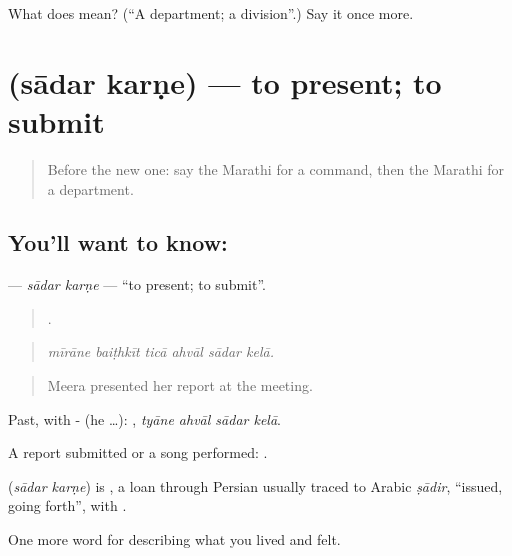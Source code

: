 \begin{tcolorbox}[breakable,colback=teal!4,colframe=teal!35!black,title={Before you move on}]
What does  mean? (\textquotedblleft{}A department; a division\textquotedblright{}.) Say it once more.
\end{tcolorbox}
\section[\texorpdfstring{\mr{सादर} \mr{करणे} (sādar karṇe)}{सादर करणे (sādar karṇe)}]{  (sādar karṇe) — to present; to submit}

\label{lesson:MR-C513-sadar-karne}



\begin{quote}
Before the new one: say the Marathi for a command, then the Marathi for a department.
\end{quote}

\subsection*{You'll want to know:  }
\textbf{ } — \emph{sādar karṇe} — \textquotedblleft{}to present; to submit\textquotedblright{}.

\begin{quote}
     .
\end{quote}

\begin{quote}
\emph{mīrāne baiṭhkīt ticā ahvāl sādar kelā.}
\end{quote}

\begin{quote}
Meera presented her report at the meeting.
\end{quote}

Past, with - (he …):    , \emph{tyāne ahvāl sādar kelā}.

A report submitted or a song performed:   .

\begin{cousinweb}
\textbf{ } (\emph{sādar karṇe}) is , a loan through Persian usually traced to Arabic \emph{ṣādir}, \textquotedblleft{}issued, going forth\textquotedblright{}, with .
\end{cousinweb}

\begin{grammarlens}[title={What you've built}]
One more word for describing what you lived and felt.
\end{grammarlens}

